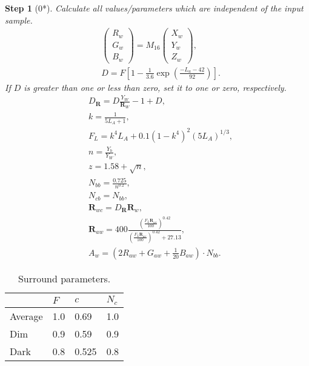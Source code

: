\documentclass[twocolumn]{scrartcl}
\theoremstyle{named}
\newtheorem*{step}{Step}
\newcommand\rgb{\bm{R}}
\begin{document}
\begin{step}[0*]
Calculate all values/parameters which are independent
of the input sample.
\begin{align*}
  &\begin{pmatrix}R_w\\G_w\\B_w\end{pmatrix}
    = M_{16}
  \begin{pmatrix}X_w\\Y_w\\Z_w\end{pmatrix},\\
  &D = F \left[1 - \tfrac{1}{3.6} \exp\left(\tfrac{-L_a-42}{92}\right)\right].
\end{align*}
If $D$ is greater than one or less than zero, set it to one or zero,
respectively.
\begin{align*}
  &D_{\rgb} = D\frac{Y_W}{\rgb_W} -1 + D,\\
  &k = \frac{1}{5L_A + 1},\\
  &F_L = k^4 L_A + 0.1 {(1-k^4)}^2 {(5L_A)}^{1/3},\\
  &n = \frac{Y_b}{Y_W},\\
  &z = 1.58 + \sqrt{n},\\
  &N_{bb} = \frac{0.725}{n^{0.2}},\\
  &N_{cb} = N_{bb},\\
  &\rgb_{wc} = D_{\rgb} \rgb_w,\\
  &\rgb_{aw} = 400
  \frac
  {{\left(\frac{F_L \rgb_{wc}}{100}\right)}^{0.42}}
  {{\left(\frac{F_L \rgb_{wc}}{100}\right)}^{0.42} + 27.13},\\
  &A_w = \left(2R_{aw} + G_{aw} + \tfrac{1}{20} B_{aw}\right) \cdot N_{bb}.
\end{align*}
\end{step}

\begin{table}\centering
  \begin{tabularx}{\linewidth}{XXXX}
  \toprule
          & $F$ & $c$   & $N_c$\\
  \midrule
  Average & 1.0 & 0.69  & 1.0\\
  Dim     & 0.9 & 0.59  & 0.9\\
  Dark    & 0.8 & 0.525 & 0.8\\
  \bottomrule
\end{tabularx}
\caption{Surround parameters.}
\end{table}
\end{document}
